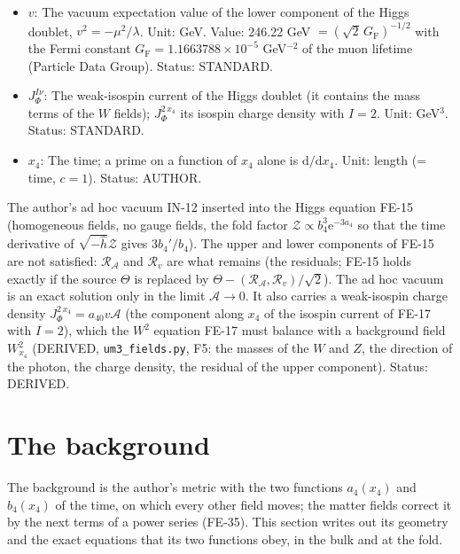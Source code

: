 \documentclass[
  10pt,
]{article}
\begin{document}
\begin{itemize}
\item
  \(v\): The vacuum expectation value of the lower component of the
  Higgs doublet, \(v^2 = -\mu^2/\lambda\). Unit: GeV. Value: 246.22 GeV
  \(= (\sqrt2\,G_{\mathrm{F}})^{-1/2}\) with the Fermi constant
  \(G_{\mathrm{F}} = 1.1663788\times10^{-5}\) GeV\(^{-2}\) of the muon
  lifetime (Particle Data Group). Status: STANDARD.
\item
  \(J_\Phi^{I\nu}\): The weak-isospin current of the Higgs doublet (it
  contains the mass terms of the \(W\) fields); \(J_\Phi^{2\,x_4}\) its
  isospin charge density with \(I = 2\). Unit: GeV\(^3\). Status:
  STANDARD.
\item
  \(x_4\): The time; a prime on a function of \(x_4\) alone is
  \(\mathrm{d}/\mathrm{d}x_4\). Unit: length (= time, \(c = 1\)).
  Status: AUTHOR.
\end{itemize}

The author's ad hoc vacuum IN-12 inserted into the Higgs equation FE-15
(homogeneous fields, no gauge fields, the fold factor
\(\mathcal{Z} \propto b_4^3\mathrm{e}^{-3a_4}\) so that the time
derivative of \(\sqrt{-\hat h}\mathcal{Z}\) gives \(3b_4'/b_4\)). The
upper and lower components of FE-15 are not satisfied:
\(\mathcal{R}_{\mathcal{A}}\) and \(\mathcal{R}_v\) are what remains
(the residuals; FE-15 holds exactly if the source \(\Theta\) is replaced
by \(\Theta - (\mathcal{R}_{\mathcal{A}}, \mathcal{R}_v)/\sqrt2\)). The
ad hoc vacuum is an exact solution only in the limit
\(\mathcal{A} \to 0\). It also carries a weak-isospin charge density
\(J_\Phi^{2\,x_4} = a_{40}v\mathcal{A}\) (the component along \(x_4\) of
the isospin current of FE-17 with \(I = 2\)), which the \(W^2\) equation
FE-17 must balance with a background field \(W^2_{x_4}\) (DERIVED,
\texttt{um3\_fields.py}, F5: the masses of the \(W\) and \(Z\), the
direction of the photon, the charge density, the residual of the upper
component). Status: DERIVED.

\hypertarget{the-background}{%
\section{The background}\label{the-background}}

The background is the author's metric with the two functions
\(a_4(x_4)\) and \(b_4(x_4)\) of the time, on which every other field
moves; the matter fields correct it by the next terms of a power series
(FE-35). This section writes out its geometry and the exact equations
that its two functions obey, in the bulk and at the fold.
\end{document}
